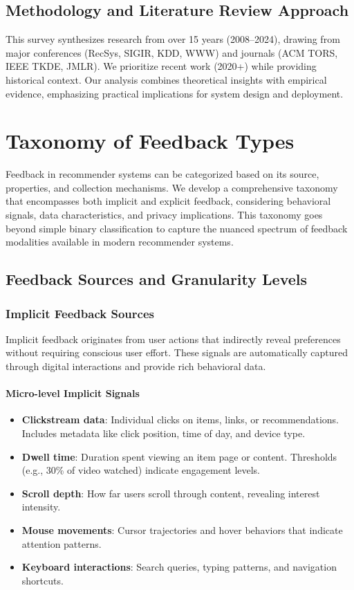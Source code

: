 \documentclass[acmsmall,review,anonymous]{acmart}
\begin{document}
\subsection{Methodology and Literature Review Approach}

This survey synthesizes research from over 15 years (2008--2024), drawing from major conferences (RecSys, SIGIR, KDD, WWW) and journals (ACM TORS, IEEE TKDE, JMLR). We prioritize recent work (2020+) while providing historical context. Our analysis combines theoretical insights with empirical evidence, emphasizing practical implications for system design and deployment.

\section{Taxonomy of Feedback Types}
\label{sec:taxonomy}

Feedback in recommender systems can be categorized based on its source, properties, and collection mechanisms. We develop a comprehensive taxonomy that encompasses both implicit and explicit feedback, considering behavioral signals, data characteristics, and privacy implications. This taxonomy goes beyond simple binary classification to capture the nuanced spectrum of feedback modalities available in modern recommender systems.

\subsection{Feedback Sources and Granularity Levels}

\subsubsection{Implicit Feedback Sources}
Implicit feedback originates from user actions that indirectly reveal preferences without requiring conscious user effort. These signals are automatically captured through digital interactions and provide rich behavioral data.

\paragraph{Micro-level Implicit Signals}
\begin{itemize}
    \item \textbf{Clickstream data}: Individual clicks on items, links, or recommendations. Includes metadata like click position, time of day, and device type.
    \item \textbf{Dwell time}: Duration spent viewing an item page or content. Thresholds (e.g., 30\% of video watched) indicate engagement levels.
    \item \textbf{Scroll depth}: How far users scroll through content, revealing interest intensity.
    \item \textbf{Mouse movements}: Cursor trajectories and hover behaviors that indicate attention patterns.
    \item \textbf{Keyboard interactions}: Search queries, typing patterns, and navigation shortcuts.
\end{itemize}
\end{document}
